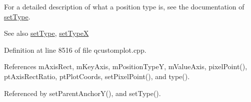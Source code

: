 For a detailed description of what a position type is, see the documentation of \hyperlink{class_q_c_p_item_position_aa476abf71ed8fa4c537457ebb1a754ad}{set\+Type}.

\begin{DoxySeeAlso}{See also}
\hyperlink{class_q_c_p_item_position_aa476abf71ed8fa4c537457ebb1a754ad}{set\+Type}, \hyperlink{class_q_c_p_item_position_a2113b2351d6d00457fb3559a4e20c3ea}{set\+Type\+X} 
\end{DoxySeeAlso}


Definition at line 8516 of file qcustomplot.\+cpp.



References m\+Axis\+Rect, m\+Key\+Axis, m\+Position\+Type\+Y, m\+Value\+Axis, pixel\+Point(), pt\+Axis\+Rect\+Ratio, pt\+Plot\+Coords, set\+Pixel\+Point(), and type().



Referenced by set\+Parent\+Anchor\+Y(), and set\+Type().


